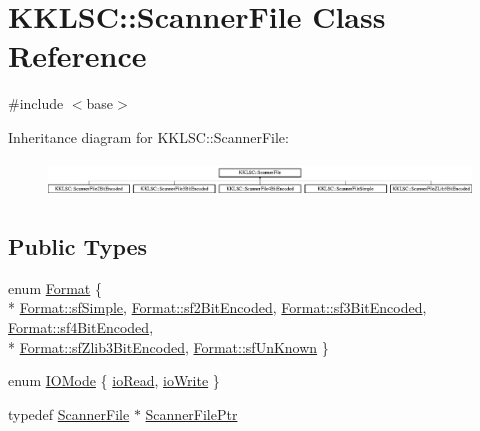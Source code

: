 \hypertarget{class_k_k_l_s_c_1_1_scanner_file}{}\section{K\+K\+L\+SC\+:\+:Scanner\+File Class Reference}
\label{class_k_k_l_s_c_1_1_scanner_file}


{\ttfamily \#include $<$base$>$}

Inheritance diagram for K\+K\+L\+SC\+:\+:Scanner\+File\+:\begin{figure}[H]
\begin{center}
\leavevmode
\includegraphics[height=0.965517cm]{class_k_k_l_s_c_1_1_scanner_file}
\end{center}
\end{figure}
\subsection*{Public Types}
\begin{DoxyCompactItemize}
\item 
enum \hyperlink{class_k_k_l_s_c_1_1_scanner_file_a9eb976c9d084a94db71a5e8d1fadb903}{Format} \{ \\*
\hyperlink{class_k_k_l_s_c_1_1_scanner_file_a9eb976c9d084a94db71a5e8d1fadb903a7230911a32d0f83589b687452a05523f}{Format\+::sf\+Simple}, 
\hyperlink{class_k_k_l_s_c_1_1_scanner_file_a9eb976c9d084a94db71a5e8d1fadb903af3095a7a2ca6c23dfd11942c41a35d66}{Format\+::sf2\+Bit\+Encoded}, 
\hyperlink{class_k_k_l_s_c_1_1_scanner_file_a9eb976c9d084a94db71a5e8d1fadb903a2a9330d778623273c413369a5f990849}{Format\+::sf3\+Bit\+Encoded}, 
\hyperlink{class_k_k_l_s_c_1_1_scanner_file_a9eb976c9d084a94db71a5e8d1fadb903a624af7c88dcebdb27a791b18a6283325}{Format\+::sf4\+Bit\+Encoded}, 
\\*
\hyperlink{class_k_k_l_s_c_1_1_scanner_file_a9eb976c9d084a94db71a5e8d1fadb903a560710b758d0e94469989a47d8891e5d}{Format\+::sf\+Zlib3\+Bit\+Encoded}, 
\hyperlink{class_k_k_l_s_c_1_1_scanner_file_a9eb976c9d084a94db71a5e8d1fadb903a46f124cef43c06139c2ae4bf3f9564d0}{Format\+::sf\+Un\+Known}
 \}
\item 
enum \hyperlink{class_k_k_l_s_c_1_1_scanner_file_a084784d6bd6c64ad11cbc6cd1bfaeb7e}{I\+O\+Mode} \{ \hyperlink{class_k_k_l_s_c_1_1_scanner_file_a084784d6bd6c64ad11cbc6cd1bfaeb7ea3fa633699b2b875a4fbd47f018f13f01}{io\+Read}, 
\hyperlink{class_k_k_l_s_c_1_1_scanner_file_a084784d6bd6c64ad11cbc6cd1bfaeb7eac381f0e299cca4c6652f193aa0a9179a}{io\+Write}
 \}
\item 
typedef \hyperlink{class_k_k_l_s_c_1_1_scanner_file}{Scanner\+File} $\ast$ \hyperlink{class_k_k_l_s_c_1_1_scanner_file_a4ce197a15dc3da96b2258d55f383db2d}{Scanner\+File\+Ptr}
\end{DoxyCompactItemize}
